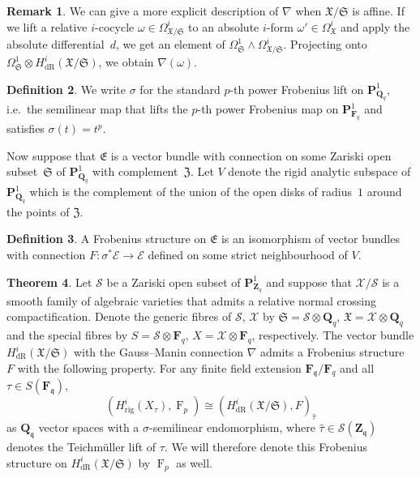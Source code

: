 \documentclass[a4paper,11pt]{article}
\numberwithin{equation}{section}
\newcommand{\ZZ}{\mathbf{Z}} %
\newcommand{\QQ}{\mathbf{Q}} %
\newcommand{\FF}{\mathbf{F}} %
\DeclareMathOperator{\Frob}{F}           %
\providecommand{\HdR}{H_{\text{dR}}}    %
\providecommand{\Hrig}{H_{\text{rig}}}  %
\theoremstyle{definition}
\newtheorem{thm}{Theorem}[section]
\newtheorem{defn}[thm]{Definition}
\newtheorem{rem}[thm]{Remark}
\begin{document}
\begin{rem}
We can give a more explicit description of $\nabla$ when 
$\mathfrak{X}/\mathfrak{S}$ is affine. If we lift a relative $i$-cocycle 
$\omega \in \Omega^i_{\mathfrak{X}/\mathfrak{S}}$ to an absolute $i$-form 
$\omega' \in \Omega^i_{\mathfrak{X}}$ and apply the absolute differential~$d$, 
we get an element of 
$\Omega^1_{\mathfrak{S}} \wedge \Omega^i_{\mathfrak{X}/\mathfrak{S}}$. 
Projecting onto 
$\Omega^1_{\mathfrak{S}} \otimes \HdR^i(\mathfrak{X}/\mathfrak{S})$, 
we obtain $\nabla(\omega)$. 
\end{rem}

\begin{defn} \label{defn:sigma}
We write $\sigma$ for the standard $p$-th power Frobenius lift on 
$\mathbf{P}^1_{\QQ_q}$, i.e.\ the semilinear map that lifts the $p$-th power 
Frobenius map on $\mathbf{P}^1_{\FF_q}$ and satisfies $\sigma(t)=t^p$. 
\end{defn}

Now suppose that $\mathfrak{E}$ is a vector bundle with connection on 
some Zariski open subset~$\mathfrak{S}$ of $\mathbf{P}^1_{\QQ_q}$ with 
complement~$\mathfrak{Z}$. Let $V$ denote the rigid analytic subspace 
of $\mathbf{P}^1_{\QQ_q}$ which is the complement of the union of the 
open disks of radius~$1$ around the points of $\mathfrak{Z}$.

\begin{defn}
A Frobenius structure on $\mathfrak{E}$ is an isomorphism of vector bundles 
with connection $F \colon \sigma^* \mathcal{E} \rightarrow \mathcal{E}$ 
defined on some strict neighbourhood of $V$. 
\end{defn}

\begin{thm} \label{thm:frobstruc}
Let $\mathcal{S}$ be a Zariski open subset of $\mathbf{P}^1_{\ZZ_q}$ and 
suppose that $\mathcal{X}/\mathcal{S}$ is a smooth family of algebraic 
varieties that admits a relative normal crossing compactification. Denote 
the generic fibres of $\mathcal{S}$, $\mathcal{X}$ by 
$\mathfrak{S}=\mathcal{S} \otimes \QQ_q$, $\mathfrak{X}=\mathcal{X} \otimes \QQ_q$ 
and the special fibres by $S=\mathcal{S} \otimes \FF_q$, 
$X=\mathcal{X} \otimes \FF_q$, respectively. The vector bundle 
$\HdR^i(\mathfrak{X}/\mathfrak{S})$ with the Gauss--Manin connection $\nabla$ 
admits a Frobenius structure $F$ with the following property. 
For any finite field extension $\FF_{\mathfrak{q}}/\FF_q$ and
all $\tau \in S(\FF_{\mathfrak{q}})$,
\[
(\Hrig^i(X_{\tau}),\Frob_p) \cong (\HdR^i(\mathfrak{X}/\mathfrak{S}),F)_{\hat{\tau}}
\] 
as $\QQ_{\mathfrak{q}}$ vector spaces with a $\sigma$-semilinear 
endomorphism, where $\hat{\tau} \in \mathcal{S}(\ZZ_{\mathfrak{q}})$ denotes 
the Teichm\"uller lift of $\tau$. We will therefore denote this Frobenius 
structure on $\HdR^i(\mathfrak{X}/\mathfrak{S})$ by $\Frob_p$ as well.
\end{thm}
\end{document}
